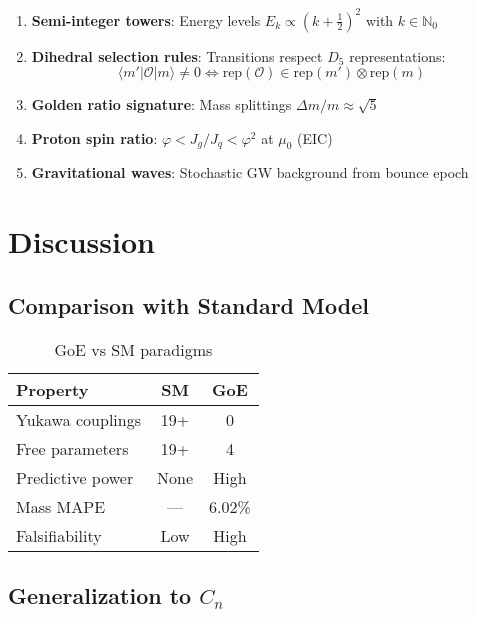 \documentclass[twocolumn,preprintnumbers,amsmath,amssymb,superscriptaddress]{revtex4-2}
\newcommand{\Dfive}{D_5}
\newcommand{\varphig}{\varphi}
\begin{document}
\begin{enumerate}
\item \textbf{Semi-integer towers}: Energy levels $E_k \propto (k + \frac{1}{2})^2$ with $k \in \mathbb{N}_0$

\item \textbf{Dihedral selection rules}: Transitions respect $\Dfive$ representations:
\begin{equation}
\langle m' | \mathcal{O} | m \rangle \neq 0 \Leftrightarrow \text{rep}(\mathcal{O}) \in \text{rep}(m') \otimes \text{rep}(m)
\end{equation}

\item \textbf{Golden ratio signature}: Mass splittings $\Delta m / m \approx \sqrt{5}$

\item \textbf{Proton spin ratio}: $\varphig < J_g/J_q < \varphig^2$ at $\mu_0$ (EIC)

\item \textbf{Gravitational waves}: Stochastic GW background from bounce epoch
\end{enumerate}

\section{Discussion}

\subsection{Comparison with Standard Model}

\begin{table}[h]
\caption{GoE vs SM paradigms}
\begin{ruledtabular}
\begin{tabular}{lcc}
Property & SM & GoE \\
\hline
Yukawa couplings & 19+ & 0 \\
Free parameters & 19+ & 4 \\
Predictive power & None & High \\
Mass MAPE & — & 6.02\% \\
Falsifiability & Low & High \\
\end{tabular}
\end{ruledtabular}
\end{table}

\subsection{Generalization to $C_n$}
\end{document}
